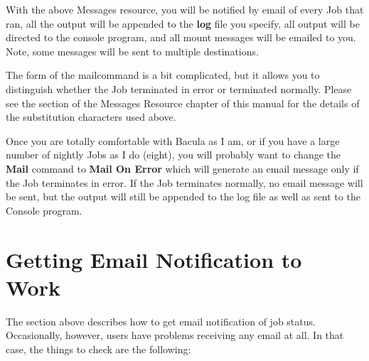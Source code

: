 With the above Messages resource, you will be notified by email of every Job
that ran, all the output will be appended to the {\bf log} file you specify,
all output will be directed to the console program, and all mount messages
will be emailed to you. Note, some messages will be sent to multiple
destinations.

The form of the mailcommand is a bit complicated, but it allows you to
distinguish whether the Job terminated in error or terminated normally. Please
see the
 section of the Messages
Resource chapter of this manual for the details of the substitution characters
used above.

Once you are totally comfortable with Bacula as I am, or if you have a large
number of nightly Jobs as I do (eight), you will probably want to change the
{\bf Mail} command to {\bf Mail On Error} which will generate an email message
only if the Job terminates in error. If the Job terminates normally, no email
message will be sent, but the output will still be appended to the log file as
well as sent to the Console program.

\section{Getting Email Notification to Work}
\label{email}

The section above describes how to get email notification of job status.
Occasionally, however, users have problems receiving any email at all. In that
case, the things to check are the following:

